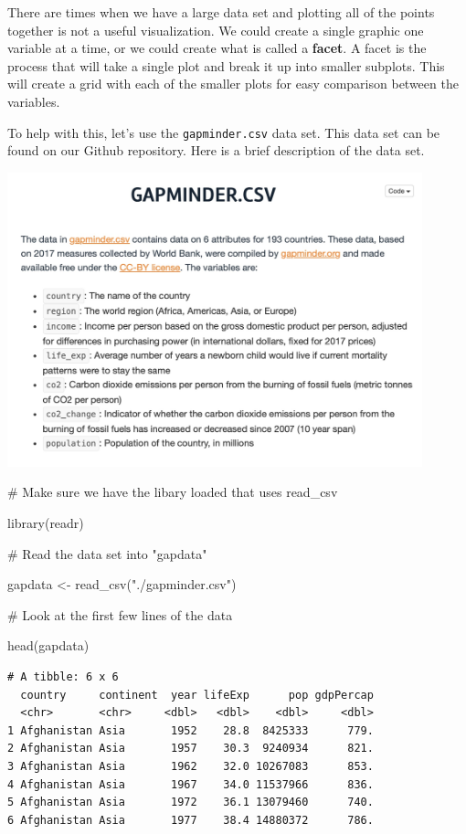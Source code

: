 \documentclass[
  letterpaper,
  DIV=11,
  numbers=noendperiod]{scrreprt}
\newenvironment{Shaded}{\begin{snugshade}}{\end{snugshade}}
\newcommand{\CommentTok}[1]{\textcolor[rgb]{0.37,0.37,0.37}{#1}}
\newcommand{\FunctionTok}[1]{\textcolor[rgb]{0.28,0.35,0.67}{#1}}
\newcommand{\NormalTok}[1]{\textcolor[rgb]{0.00,0.23,0.31}{#1}}
\newcommand{\OtherTok}[1]{\textcolor[rgb]{0.00,0.23,0.31}{#1}}
\newcommand{\StringTok}[1]{\textcolor[rgb]{0.13,0.47,0.30}{#1}}
\begin{document}

There are times when we have a large data set and plotting all of the
points together is not a useful visualization. We could create a single
graphic one variable at a time, or we could create what is called a
\textbf{facet}. A facet is the process that will take a single plot and
break it up into smaller subplots. This will create a grid with each of
the smaller plots for easy comparison between the variables.

To help with this, let's use the \texttt{gapminder.csv} data set. This
data set can be found on our Github repository. Here is a brief
description of the data set.

\includegraphics[width=0.9\textwidth,height=\textheight]{./images/AST_3.jpg}

\begin{Shaded}
\begin{Highlighting}[]
\CommentTok{\# Make sure we have the libary loaded that uses read\_csv}

\FunctionTok{library}\NormalTok{(readr)}

\CommentTok{\# Read the data set into "gapdata"}

\NormalTok{gapdata }\OtherTok{\textless{}{-}} \FunctionTok{read\_csv}\NormalTok{(}\StringTok{"./gapminder.csv"}\NormalTok{)}

\CommentTok{\# Look at the first few lines of the data}

\FunctionTok{head}\NormalTok{(gapdata)}
\end{Highlighting}
\end{Shaded}

\begin{verbatim}
# A tibble: 6 x 6
  country     continent  year lifeExp      pop gdpPercap
  <chr>       <chr>     <dbl>   <dbl>    <dbl>     <dbl>
1 Afghanistan Asia       1952    28.8  8425333      779.
2 Afghanistan Asia       1957    30.3  9240934      821.
3 Afghanistan Asia       1962    32.0 10267083      853.
4 Afghanistan Asia       1967    34.0 11537966      836.
5 Afghanistan Asia       1972    36.1 13079460      740.
6 Afghanistan Asia       1977    38.4 14880372      786.
\end{verbatim}
\end{document}
